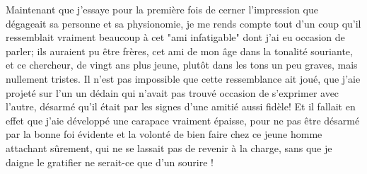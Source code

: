 Maintenant que j'essaye pour la première fois de cerner l'impression que dégageait sa personne et sa physionomie, je me rends compte tout d'un coup qu'il ressemblait vraiment beaucoup à cet "ami infatigable" dont j'ai eu occasion de parler; ils auraient pu être frères, cet ami de mon âge dans la tonalité souriante, et ce chercheur, de vingt ans plus jeune, plutôt dans les tons un peu graves, mais nullement tristes. Il n'est pas impossible que cette ressemblance ait joué, que j'aie projeté sur l'un un dédain qui n'avait pas trouvé occasion de s'exprimer avec l'autre, désarmé qu'il était par les signes d'une amitié aussi fidèle! Et il fallait en effet que j'aie développé une carapace vraiment épaisse, pour ne pas être désarmé par la bonne foi évidente et la volonté de bien faire chez ce jeune homme attachant sûrement, qui ne se lassait pas de revenir à la charge, sans que je daigne le gratifier ne serait-ce que d'un sourire !



